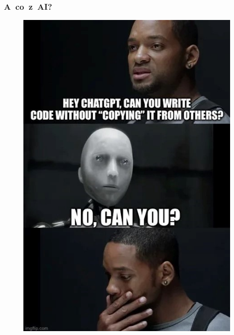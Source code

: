 \documentclass[10pt,t]{beamer}
\begin{document}
\begin{frame}
  \frametitle{A~co~z~AI?}

  \vspace{-0.5em}


  \begin{figure}

    \label{fig:Coping-for-others}

    \centering


    \includegraphics[scale=0.41]
    {./Presentations-pictures/Copying-from-others.jpg}

  \end{figure}

\end{frame}
\end{document}
